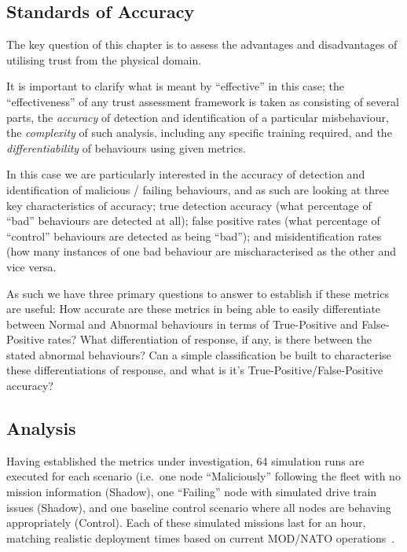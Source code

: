 \subsection{Standards of Accuracy}\label{sec:standards}

The key question of this chapter is to assess the advantages and disadvantages of utilising trust from the physical domain. 

It is important to clarify what is meant by ``effective'' in this case; the ``effectiveness'' of any trust assessment framework is taken as consisting of several parts, the \emph{accuracy} of detection and identification of a particular misbehaviour, the \emph{complexity} of such analysis, including any specific training required, and the \emph{differentiability} of behaviours using given metrics.

In this case we are particularly interested in the accuracy of detection and identification of malicious / failing behaviours, and as such are looking at three key characteristics of accuracy; true detection accuracy (what percentage of ``bad'' behaviours are detected at all); false positive rates (what percentage of ``control'' behaviours are detected as being ``bad''); and misidentification rates (how many instances of one bad behaviour are mischaracterised as the other and vice versa.

As such we have three primary questions to answer to establish if these metrics are useful: 
How accurate are these metrics in being able to easily differentiate between Normal and Abnormal behaviours in terms of True-Positive and False-Positive rates?
What differentiation of response, if any, is there between the stated abnormal behaviours?
Can a simple classification be built to characterise these differentiations of response, and what is it's True-Positive/False-Positive accuracy?


\subsection{Analysis}
Having established the metrics under investigation, 64 simulation runs are executed for each scenario (i.e.\ one node ``Maliciously'' following the fleet with no mission information (Shadow), one ``Failing'' node with simulated drive train issues (Shadow), and one baseline control scenario where all nodes are behaving appropriately (Control).
Each of these simulated missions last for an hour, matching realistic deployment times based on current MOD/NATO operations~\cite{Bolster2014a}.

